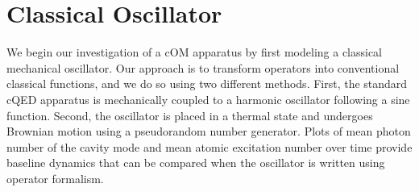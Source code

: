 \chapter{Classical Oscillator}
We begin our investigation of a cOM apparatus by first modeling a classical mechanical oscillator. Our approach is to transform operators into conventional classical functions, and we do so using two different methods. First, the standard cQED apparatus is mechanically coupled to a harmonic oscillator following a sine function. Second, the oscillator is placed in a thermal state and undergoes Brownian motion using a pseudorandom number generator. Plots of mean photon number of the cavity mode and mean atomic excitation number over time provide baseline dynamics that can be compared when the oscillator is written using operator formalism.

